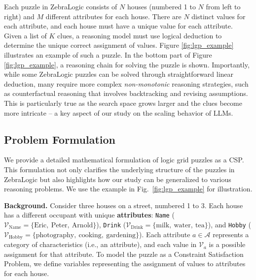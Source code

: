Each puzzle in ZebraLogic consists of $N$ houses (numbered 1 to $N$ from left to right) and $M$ different attributes for each house. There are $N$ distinct values for each attribute, and each house must have a unique value for each attribute. Given a list of $K$ clues, a reasoning model must use logical deduction to determine the unique correct assignment of values. Figure \ref{fig:lgp_example} illustrates an example of such a puzzle.
In the bottom part of Figure \ref{fig:lgp_example}, a reasoning chain for solving the puzzle is shown. 
Importantly, while some ZebraLogic puzzles can be solved through straightforward linear deduction, many require more complex \textit{non-monotonic} reasoning strategies, such as counterfactual reasoning that involves backtracking and revising assumptions. This is particularly true as the search space grows larger and the clues become more intricate -- a key aspect of our study on the scaling behavior of LLMs.
 




\subsection{Problem Formulation}
 
We provide a detailed mathematical formulation of logic grid puzzles as a CSP.
This formulation not only clarifies the underlying structure of the puzzles in ZebraLogic but also highlights how our study can be generalized to various reasoning problems.
We use the example in Fig.~\ref{fig:lgp_example} for illustration.

\textbf{Background.} Consider three houses on a street, numbered 1 to 3. Each house has a different occupant with unique \textbf{attributes}: \texttt{Name} (\(\mathcal{V}_{\text{Name}} = \{ \text{Eric},\ \text{Peter},\ \text{Arnold} \}\)), \texttt{Drink} (\(\mathcal{V}_{\text{Drink}} = \{ \text{milk},\ \text{water},\ \text{tea} \}\)), and \texttt{Hobby} (\(\mathcal{V}_{\text{Hobby}} = \{ \text{photography},\ \text{cooking},\ \text{gardening} \}\)).
Each attribute \( a \in \mathcal{A} \) represents a category of characteristics (i.e., an attribute), and each value in \(\mathcal{V}_{a}\) is a possible assignment for that attribute.
To model the puzzle as a Constraint Satisfaction Problem, we define variables representing the assignment of values to attributes for each house.

